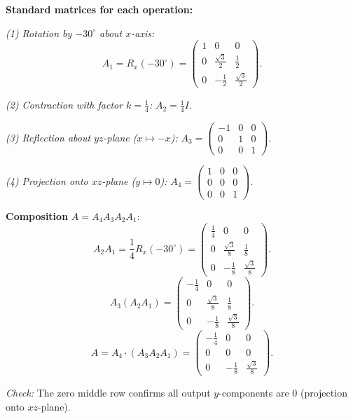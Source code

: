 \documentclass[12pt,a3paper]{article}
\begin{document}
\begin{tcolorbox}[enhanced,breakable,
  colback=cF!4,colframe=cF,boxrule=0.8pt,arc=5pt,
  title={\textbf{Answer --- Composition: Rot$(-30^\circ,x)$ $\to$ Contract$(\frac{1}{4})$ $\to$ Reflect$(yz)$ $\to$ Project$(xz)$}},
  fonttitle=\bfseries\color{white},colbacktitle=cF]

\textbf{Standard matrices for each operation:}

\textit{(1) Rotation by $-30^\circ$ about $x$-axis:}
\[
A_1=R_x(-30^\circ)=\begin{pmatrix}1&0&0\\0&\frac{\sqrt{3}}{2}&\frac{1}{2}\\0&-\frac{1}{2}&\frac{\sqrt{3}}{2}\end{pmatrix}.
\]

\textit{(2) Contraction with factor $k=\frac{1}{4}$:}
$A_2=\frac{1}{4}I$.

\textit{(3) Reflection about $yz$-plane ($x\mapsto-x$):}
$A_3=\begin{pmatrix}-1&0&0\\0&1&0\\0&0&1\end{pmatrix}$.

\textit{(4) Projection onto $xz$-plane ($y\mapsto 0$):}
$A_4=\begin{pmatrix}1&0&0\\0&0&0\\0&0&1\end{pmatrix}$.

\textbf{Composition} $A=A_4A_3A_2A_1$:
\[
A_2A_1=\frac{1}{4}R_x(-30^\circ)=\begin{pmatrix}\frac{1}{4}&0&0\\0&\frac{\sqrt{3}}{8}&\frac{1}{8}\\0&-\frac{1}{8}&\frac{\sqrt{3}}{8}\end{pmatrix}.
\]
\[
A_3(A_2A_1)=\begin{pmatrix}-\frac{1}{4}&0&0\\0&\frac{\sqrt{3}}{8}&\frac{1}{8}\\0&-\frac{1}{8}&\frac{\sqrt{3}}{8}\end{pmatrix}.
\]
\[
A=A_4\cdot(A_3A_2A_1)=\begin{pmatrix}-\frac{1}{4}&0&0\\0&0&0\\0&-\frac{1}{8}&\frac{\sqrt{3}}{8}\end{pmatrix}.
\]

\textit{Check:} The zero middle row confirms all output $y$-components are 0 (projection onto $xz$-plane).

\end{tcolorbox}
\end{document}
